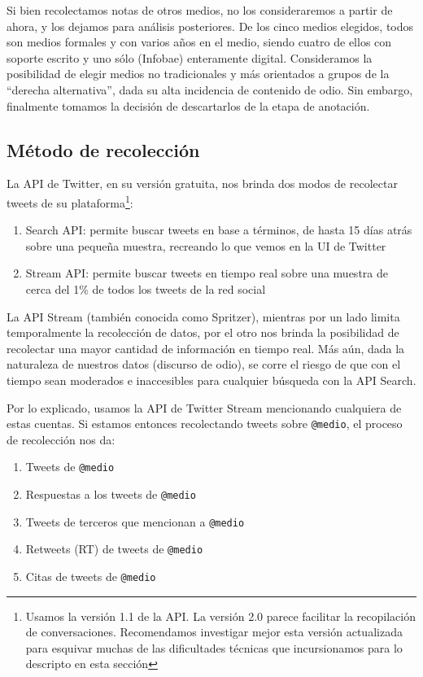 Si bien recolectamos notas de otros medios, no los consideraremos a partir de ahora, y los dejamos para análisis posteriores. De los cinco medios elegidos, todos son medios formales y con varios años en el medio, siendo cuatro de ellos con soporte escrito y uno sólo (Infobae) enteramente digital. Consideramos la posibilidad de elegir medios no tradicionales y más orientados a grupos de la ``derecha alternativa'', dada su alta incidencia de contenido de odio. Sin embargo, finalmente tomamos la decisión de descartarlos de la etapa de anotación.


\subsection{Método de recolección}



La API de Twitter, en su versión gratuita, nos brinda dos modos de recolectar tweets de su plataforma\footnote{Usamos la versión 1.1 de la API. La versión 2.0 parece facilitar la recopilación de conversaciones. Recomendamos investigar mejor esta versión actualizada para esquivar muchas de las dificultades técnicas que incursionamos para lo descripto en esta sección}:

\begin{enumerate}
    \item Search API: permite buscar tweets en base a términos, de hasta 15 días atrás sobre una pequeña muestra, recreando lo que vemos en la UI de Twitter
    \item Stream API: permite buscar tweets en tiempo real sobre una muestra de cerca del 1\% de todos los tweets de la red social
\end{enumerate}

La API Stream (también conocida como Spritzer), mientras por un lado limita temporalmente la recolección de datos, por el otro nos brinda la posibilidad de recolectar una mayor cantidad de información en tiempo real. Más aún, dada la naturaleza de nuestros datos (discurso de odio), se corre el riesgo de que con el tiempo sean moderados e inaccesibles para cualquier búsqueda con la API Search.

Por lo explicado, usamos la API de Twitter Stream mencionando cualquiera de estas cuentas. Si estamos entonces recolectando tweets sobre \verb|@medio|, el proceso de recolección nos da:

\begin{enumerate}
    \item Tweets de \verb|@medio|
    \item Respuestas a los tweets de \verb|@medio|
    \item Tweets de terceros que mencionan a \verb|@medio|
    \item Retweets (RT) de tweets de \verb|@medio|
    \item Citas de tweets de \verb|@medio|
\end{enumerate}

